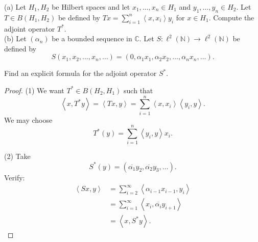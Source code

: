 \begin{problem}
	(a) Let $H_1, H_2$ be Hilbert spaces and let $x_1, \ldots, x_n \in H_1$ and $y_1, \ldots, y_n \in H_2$. Let $T \in B\left(H_1, H_2\right)$ be defined by $T x=\sum_{i=1}^n\left\langle x, x_i\right\rangle y_i$ for $x \in H_1$. Compute the adjoint operator $T^*$.\\
(b) Let $\left(\alpha_n\right)$ be a bounded sequence in $\mathbb{C}$. Let $S: \ell^2(\mathbb{N}) \rightarrow \ell^2(\mathbb{N})$ be defined by
\[
S\left(x_1, x_2, \ldots, x_n, \ldots\right)=\left(0, \alpha_1 x_1, \alpha_2 x_2, \ldots, \alpha_n x_n, \ldots\right) .
\]

Find an explicit formula for the adjoint operator $S^*$.
\end{problem}
\begin{proof}
	(1) We want $T^* \in B(H_2, H_1)$ such that
	\[
		\left\langle x, T^*y \right\rangle 
		= \left\langle T x, y \right\rangle 
		= \sum_{i=1}^{n} \left\langle x, x_i \right\rangle \left\langle y_i, y \right\rangle 
	.\] 
	We may choose
	\[
		T^*(y) = \sum_{i=1}^{n} \left\langle y_i, y \right\rangle x_i
	.\] 

	(2)
	Take
	\[
		S^*(y) = \left( \overline{\alpha_1} y_2, \overline{\alpha_2} y_3, \ldots  \right) 
	.\] 
	Verify:
	\begin{align*}
		\left\langle S x, y \right\rangle 
		&= \sum_{i=2}^{\infty } \left\langle \alpha_{i - 1} x_{i-1 }, y_i \right\rangle  \\
		&= \sum_{i=1}^{\infty} \left\langle x_i, \overline{\alpha_i}  y_{i + 1} \right\rangle  \\
		&= \left\langle x, S^*y \right\rangle  
	.\end{align*}

\end{proof}

